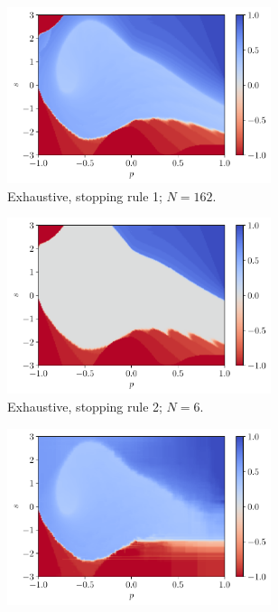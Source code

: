 \documentclass[a4paper, 12pt]{article}
\begin{document}
    \begin{figure}[H]
        \centering
        \begin{subfigure}{0.49\textwidth}
            \centering
            \includegraphics[width=0.85\textwidth]{resources/pdf/4_exhaustive_1_XRT_q_-4.pdf}
            \caption{Exhaustive, stopping rule 1; $N = 162$.}
            \vspace{0.5em}
        \end{subfigure}
        \hfill
        \begin{subfigure}{0.49\textwidth}
            \centering
            \includegraphics[width=0.85\textwidth]{resources/pdf/4_exhaustive_2_XRT_q_-4.pdf}
            \caption{Exhaustive, stopping rule 2; $N = 6$.}
            \vspace{0.5em}
        \end{subfigure}
        \begin{subfigure}{0.49\textwidth}
            \centering
            \includegraphics[width=0.85\textwidth]{resources/pdf/4_montecarlo_1_XRT_q_-4.pdf}

\end{subfigure}
\end{figure}
\end{document}
